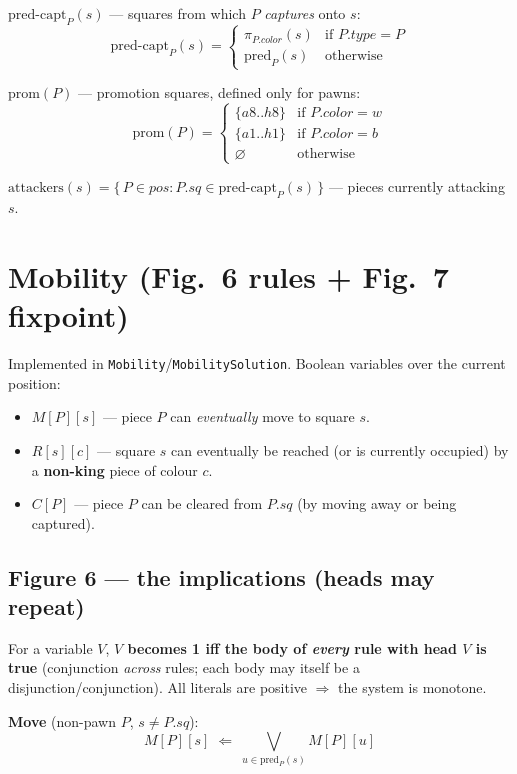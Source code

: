 \documentclass[11pt]{article}
\newcommand{\code}[1]{\texttt{#1}}
\theoremstyle{plain}
\theoremstyle{definition}
\newcommand{\pos}{\mathit{pos}}
\newcommand{\sq}{\mathit{sq}}
\newcommand{\predP}{\mathrm{pred}_P}
\newcommand{\predcaptP}{\mathrm{pred\text{-}capt}_P}
\newcommand{\prom}{\mathrm{prom}}
\newcommand{\attackers}{\mathrm{attackers}}
\newcommand{\becomes}{\;\Longleftarrow\;}
\begin{document}
$\predcaptP(s)$ --- squares from which $P$ \emph{captures} onto $s$:
\[
  \predcaptP(s) =
  \begin{cases}
    \pi_{P.\mathit{color}}(s) & \text{if } P.\mathit{type} = P \\
    \predP(s) & \text{otherwise}
  \end{cases}
\]

$\prom(P)$ --- promotion squares, defined only for pawns:
\[
  \prom(P) =
  \begin{cases}
    \{a8..h8\} & \text{if } P.\mathit{color} = w \\
    \{a1..h1\} & \text{if } P.\mathit{color} = b \\
    \varnothing & \text{otherwise}
  \end{cases}
\]

$\attackers(s) = \{\, P \in \pos : P.\sq \in \predcaptP(s) \,\}$ --- pieces currently attacking $s$.

\section{Mobility (Fig.~6 rules + Fig.~7 fixpoint)}

Implemented in \code{Mobility}/\code{MobilitySolution}. Boolean variables over the current position:
\begin{itemize}[nosep]
  \item $M[P][s]$ --- piece $P$ can \emph{eventually} move to square $s$.
  \item $R[s][c]$ --- square $s$ can eventually be reached (or is currently occupied) by a \textbf{non-king} piece of colour $c$.
  \item $C[P]$ --- piece $P$ can be cleared from $P.\sq$ (by moving away or being captured).
\end{itemize}

\subsection{Figure 6 --- the implications (heads may repeat)}

For a variable $V$, \textbf{$V$ becomes 1 iff the body of \emph{every} rule with head $V$ is true} (conjunction
\emph{across} rules; each body may itself be a disjunction/conjunction). All literals are positive $\Rightarrow$ the
system is monotone.

\textbf{Move} (non-pawn $P$, $s \ne P.\sq$):
\[
  M[P][s] \becomes \bigvee_{u \in \predP(s)} M[P][u]
\]
\end{document}
